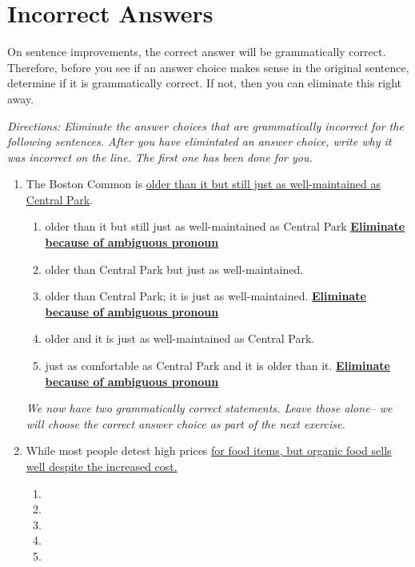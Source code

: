 \section{Incorrect Answers}

On sentence improvements, the correct answer will be grammatically correct. Therefore, before
you see if an answer choice makes sense in the original sentence, determine if it is grammatically
correct. If not, then you can eliminate this right away.

\bigskip
\textit{Directions: Eliminate the answer choices that are grammatically incorrect for the following sentences. After you have elimintated an answer choice, write why it was incorrect on the line. The first one has been done for you.}

\begin{enumerate}
\item The Boston Common is \ul{ older than it but still just as well-maintained as Central Park}.
\begin{enumerate}[label=(\Alph*)]

\item older than it but still just as well-maintained as Central Park \textbf{ \ul{Eliminate because of ambiguous pronoun}}
\item older than Central Park but just as well-maintained. \longline
\item  older than Central Park; it is just as well-maintained. \textbf{ \ul{Eliminate because of ambiguous pronoun}}
\item older and it is just as well-maintained as Central Park. \longline
\item just as comfortable as Central Park and it is older than it. \textbf{ \ul{Eliminate because of ambiguous pronoun}}
\end{enumerate}

\bigskip
\textit{We now have two grammatically correct statements. Leave those alone-- we will choose the correct answer choice as part of the next exercise.}


\bigskip
\item While most people detest high prices \ul{for food items, but organic food sells well despite the increased cost.}

\bigskip
\begin{enumerate}[label=(\Alph*)]

\item        \hrulefill
\item   \hrulefill
\item    \hrulefill
\item    \hrulefill
\item   \hrulefill
\end{enumerate}


\end{enumerate}

